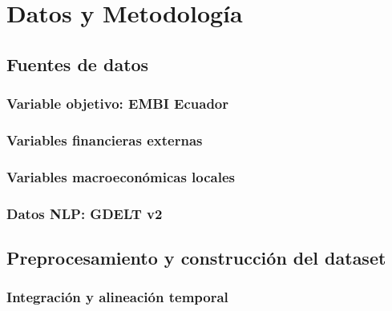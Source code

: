 \chapter{Datos y Metodología}

\section{Fuentes de datos}

\subsection{Variable objetivo: EMBI Ecuador}

\subsection{Variables financieras externas}

\subsection{Variables macroeconómicas locales}

\subsection{Datos NLP: GDELT v2}

\section{Preprocesamiento y construcción del dataset}

\subsection{Integración y alineación temporal}

